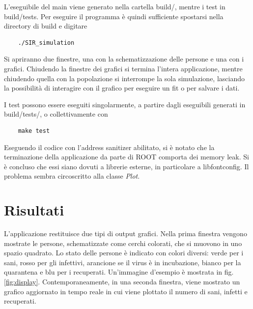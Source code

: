 \documentclass[a4paper,10pt,twocolumn]{article}
\begin{document}
L'eseguibile del main viene generato nella cartella build/, mentre i test in build/tests. Per eseguire il programma è quindi sufficiente spostarsi nella directory di build e digitare

\begin{verbatim}
    ./SIR_simulation
\end{verbatim}

Si apriranno due finestre, una con la schematizzazione delle persone e una con i grafici. Chiudendo la finestre dei grafici si termina l'intera applicazione, mentre chiudendo quella con la popolazione si interrompe la sola simulazione, lasciando la possibilità di interagire con il grafico per eseguire un fit o per salvare i dati.

I test possono essere eseguiti singolarmente, a partire dagli eseguibili generati in build/tests/, o collettivamente con

\begin{verbatim}
    make test
\end{verbatim}

Eseguendo il codice con l'address sanitizer abilitato, si è notato che la terminazione della applicazione da parte di ROOT comporta dei memory leak. Si è concluso che essi siano dovuti a librerie esterne, in particolare a libfontconfig. Il problema sembra circoscritto alla classe \emph{Plot}.

\section{Risultati}
\label{sec:risultati}
L'applicazione restituisce due tipi di output grafici. Nella prima finestra vengono mostrate le persone, schematizzate come cerchi colorati, che si muovono in uno spazio quadrato. Lo stato delle persone è indicato con colori diversi: verde per i sani, rosso per gli infettivi, arancione se il virus è in incubazione, bianco per la quarantena e blu per i recuperati. Un'immagine d'esempio è mostrata in fig. \ref{fig:display}. Contemporaneamente, in una seconda finestra, viene mostrato un grafico aggiornato in tempo reale in cui viene plottato il numero di sani, infetti e recuperati.
\end{document}
